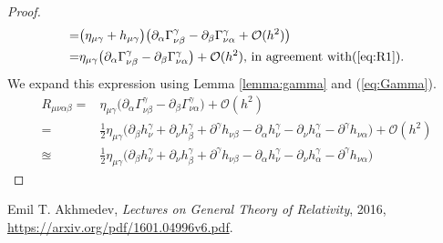 \documentclass[]{article}
\begin{document}
\begin{proof}
\begin{align*}
	=&\big(\eta_{\mu\gamma}+h_{\mu\gamma}\big) \big(\partial_{\alpha}\Gamma^{\gamma}_{\nu\beta} - \partial_{\beta}\Gamma^{\gamma}_{\nu\alpha} + \mathcal{O}(h^2)\big)\\
	=&\eta_{\mu\gamma}\big(\partial_{\alpha}\Gamma^{\gamma}_{\nu\beta} - \partial_{\beta}\Gamma^{\gamma}_{\nu\alpha} \big)+ \mathcal{O}(h^2)\text{, in agreement with(\ref{eq:R1}).}
	\end{align*}
	We expand this expression using Lemma \ref{lemma:gamma} and (\ref{eq:Gamma}).
	\begin{align*}
	R_{\mu\nu\alpha\beta} =&\eta_{\mu\gamma}\big(\partial_{\alpha}\Gamma^{\gamma}_{\nu\beta} - \partial_{\beta}\Gamma^{\gamma}_{\nu\alpha} \big)+ \mathcal{O}(h^2)\\
	=&\frac{1}{2}\eta_{\mu\gamma}\big(\partial_{\beta}h^{\gamma}_{\nu} + \partial_{\nu}h^{\gamma}_{\beta}+\partial^{\gamma}h_{\nu\beta}-\partial_{\alpha}h^{\gamma}_{\nu}-\partial_{\nu}h^{\gamma}_{\alpha}-\partial^{\gamma}h_{\nu\alpha}\big)+ \mathcal{O}(h^2)\\
	\approxeq&\frac{1}{2}\eta_{\mu\gamma}\big(\partial_{\beta}h^{\gamma}_{\nu} + \partial_{\nu}h^{\gamma}_{\beta}+\partial^{\gamma}h_{\nu\beta}-\partial_{\alpha}h^{\gamma}_{\nu}-\partial_{\nu}h^{\gamma}_{\alpha}-\partial^{\gamma}h_{\nu\alpha}\big)
	\end{align*}
\end{proof}

\begin{thebibliography}{9}
	
	Emil T. Akhmedev,
	\emph{Lectures on General Theory of Relativity},
	2016,
	\url{https://arxiv.org/pdf/1601.04996v6.pdf}.
	
	
\end{thebibliography}
\end{document}
